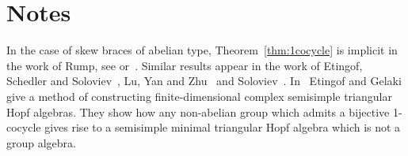 \section*{Notes}

In the case of skew braces of abelian type, Theorem~\ref{thm:1cocycle} is implicit in the work of Rump, see \cite{MR2278047,MR3291816} or~\cite{MR3177933}. Similar results appear 
in the work of Etingof, Schedler and Soloviev~\cite{MR1722951}, Lu, Yan and Zhu~\cite{MR1769723} 
and Soloviev~\cite{MR1809284}.
In~\cite{MR1653340} Etingof and Gelaki give a method of constructing finite-dimensional complex semisimple triangular Hopf algebras. They show how any non-abelian group which admits a bijective 1-cocycle gives rise to a semisimple minimal triangular Hopf algebra which is not a group algebra.
